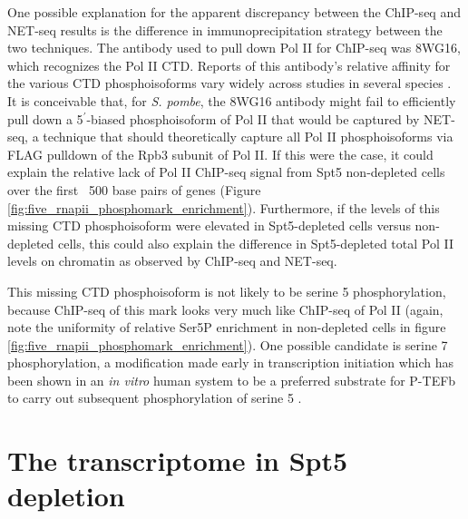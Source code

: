 One possible explanation for the apparent discrepancy between the ChIP-seq and NET-seq results is the difference in immunoprecipitation strategy between the two techniques.
The antibody used to pull down Pol II for ChIP-seq was 8WG16, which recognizes the Pol II CTD.
Reports of this antibody's relative affinity for the various CTD phosphoisoforms vary widely across studies in several species \citep{zeitlinger2007}.
It is conceivable that, for \textit{S. pombe}, the 8WG16 antibody might fail to efficiently pull down a 5$^\prime$-biased phosphoisoform of Pol II that would be captured by NET-seq, a technique that should theoretically capture all Pol II phosphoisoforms via FLAG pulldown of the Rpb3 subunit of Pol II.
If this were the case, it could explain the relative lack of Pol II ChIP-seq signal from Spt5 non-depleted cells over the first ~500 base pairs of genes (Figure \ref{fig:five_rnapii_phosphomark_enrichment}).
Furthermore, if the levels of this missing CTD phosphoisoform were elevated in Spt5-depleted cells versus non-depleted cells, this could also explain the difference in Spt5-depleted total Pol II levels on chromatin as observed by ChIP-seq and NET-seq.

This missing CTD phosphoisoform is not likely to be serine 5 phosphorylation, because ChIP-seq of this mark looks very much like ChIP-seq of Pol II (again, note the uniformity of relative Ser5P enrichment in non-depleted cells in figure \ref{fig:five_rnapii_phosphomark_enrichment}).
One possible candidate is serine 7 phosphorylation, a modification made early in transcription initiation which has been shown in an \textit{in vitro} human system to be a preferred substrate for P-TEFb to carry out subsequent phosphorylation of serine 5 \citep{czudnochowski2012}.

\section{The transcriptome in Spt5 depletion}
\label{sec:five_transcriptome}

